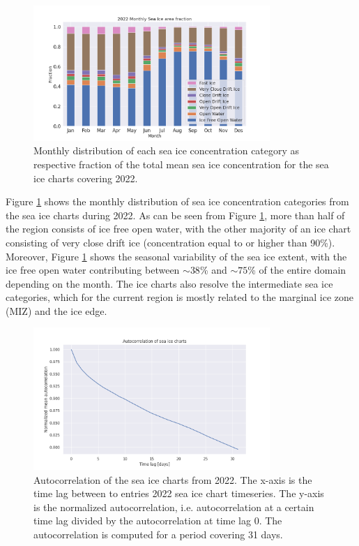 \documentclass[../main/thesis.tex]{subfiles}
\begin{document}
\begin{figure}
    \centering
    \includegraphics[width=0.8\textwidth]{2022-sic-distribution}
    \caption{\label{fig:2022-areadist-sic}Monthly distribution of each sea ice concentration category as respective fraction of the total mean sea ice concentration for the sea ice charts covering 2022.}
\end{figure}

Figure \ref{fig:2022-areadist-sic} shows the monthly distribution of sea ice concentration categories from the sea ice charts during 2022. As can be seen from Figure \ref{fig:2022-areadist-sic}, more than half of the region consists of ice free open water, with the other majority of an ice chart consisting of very close drift ice (concentration equal to or higher than 90\%). Moreover, Figure \ref{fig:2022-areadist-sic} shows the seasonal variability of the sea ice extent, with the ice free open water contributing between $\sim38$\% and $\sim75$\% of the entire domain depending on the month. The ice charts also resolve the intermediate sea ice categories, which for the current region is mostly related to the marginal ice zone (MIZ) and the ice edge.

\begin{figure}
    \centering
    \includegraphics[width = 0.8\textwidth]{autocorr_icechart}
    \caption{\label{fig:autocorr}Autocorrelation of the sea ice charts from 2022. The x-axis is the time lag between to entries 2022 sea ice chart timeseries. The y-axis is the normalized autocorrelation, i.e. autocorrelation at a certain time lag divided by the autocorrelation at time lag 0. The autocorrelation is computed for a period covering 31 days.}
\end{figure}
\end{document}
